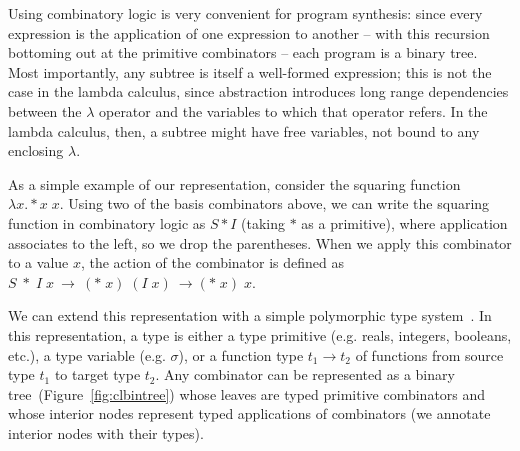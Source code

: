 \documentclass{article}
\begin{document}
Using combinatory logic is very convenient for program synthesis:
since every expression is the application of one expression to another
-- with this recursion bottoming out at the primitive combinators --
each program is a binary tree. Most importantly, any subtree is itself
a well-formed expression; this is not the case in the lambda calculus,
since abstraction introduces long range dependencies between the
$\lambda$ operator and the variables to which that operator refers. In
the lambda calculus, then, a subtree might have free variables, not
bound to any enclosing $\lambda$.

As a simple example of our representation, consider the squaring
function $\lambda x. * x\; x $. Using two of the basis combinators
above, we can write the squaring function in combinatory logic as $S *
I$ (taking $*$ as a primitive), where application associates to the
left, so we drop the parentheses. When we apply this combinator to a
value $x$, the action of the combinator is defined as $S \;*\; I\;
x~\rightarrow~(*\; x)\; (I\; x)~\rightarrow(*\; x)\; x$.

We can extend this representation with a simple polymorphic type
system~\cite{Pierce_2002}. In this representation, a type is either a
type primitive (e.g. reals, integers, booleans, etc.), a type variable
(e.g. $\sigma$), or a function type $ t_1 \rightarrow t_2$ of
functions from source type $t_1$ to target type $t_2$. Any combinator
can be represented as a binary tree~(Figure~\ref{fig:clbintree}) whose
leaves are typed primitive combinators and whose interior nodes
represent typed applications of combinators (we annotate interior
nodes with their types).
\end{document}
